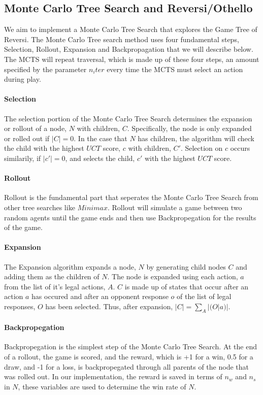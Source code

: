 \documentclass[../report.tex]{subfiles}
\begin{document}
\subsection{Monte Carlo Tree Search and Reversi/Othello}
We aim to implement a Monte Carlo Tree Search that explores the Game Tree of Reversi. The Monte Carlo Tree search method uses four fundamental steps, Selection, Rollout, Expansion and Backpropagation that we will describe below. The MCTS will repeat traversal, which is made up of these four steps, an amount specified by the parameter $n_iter$ every time the MCTS must select an action during play.

\paragraph{Selection}
The selection portion of the Monte Carlo Tree Search determines the expansion or rollout of a node, $N$ with children, $C$. Specifically, the node is only expanded or rolled out if $|C| = 0$. In the case that $N$ has children, the algorithm will check the child with the highest $UCT$ score, $c$ with children, $C'$. Selection on $c$ occurs similarily, if $|c'| = 0$, and selects the child, $c'$ with the highest $UCT$ score.

\paragraph{Rollout}
Rollout is the fundamental part that seperates the Monte Carlo Tree Search from other tree searches like $Minimax$. Rollout will simulate a game between two random agents until the game ends and then use Backpropegation for the results of the game.

\paragraph{Expansion}
The Expansion algorithm expands a node, $N$ by generating child nodes $C$ and adding them as the children of $N$. The node is expanded using each action, $a$ from the list of it's legal actions, $A$. $C$ is made up of states that occur after an action $a$ has occured and after an opponent response $o$ of the list of legal responses, $O$ has been selected. Thus, after expansion, $|C| = \sum_{A}|(O | a)|$.

\paragraph{Backpropegation}
Backpropegation is the simplest step of the Monte Carlo Tree Search. At the end of a rollout, the game is scored, and the reward, which is +1 for a win, 0.5 for a draw, and -1 for a loss, is backpropegated through all parents of the node that was rolled out. In our implementation, the reward is saved in terms of $n_w$ and $n_s$ in $N$, these variables are used to determine the win rate of $N$. 
\end{document}
